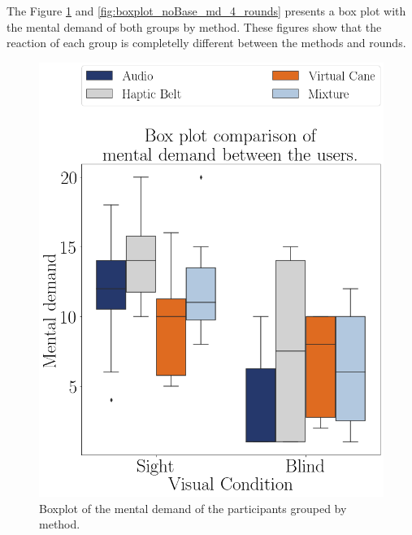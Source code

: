 The Figure \ref{fig:boxplot_noBase_md_4_scene} and \ref{fig:boxplot_noBase_md_4_rounds} presents a box plot with the mental demand of both groups by method. These figures show that the reaction of each group is completelly different between the methods and rounds.

\begin{figure}[!htb]
    \centering
    \begin{minipage}{0.45\textwidth}
        \centering
        \includegraphics[width = 0.8\linewidth]{Resultados/Nasa/Figuras/png/boxplot_noBase_md_4_scene.png}
        \caption{Boxplot of the mental demand of the participants grouped by method.}
        \label{fig:boxplot_noBase_md_4_scene}
    \end{minipage}
    \begin{minipage}{0.45\textwidth}
        \centering

\end{minipage}
\end{figure}
